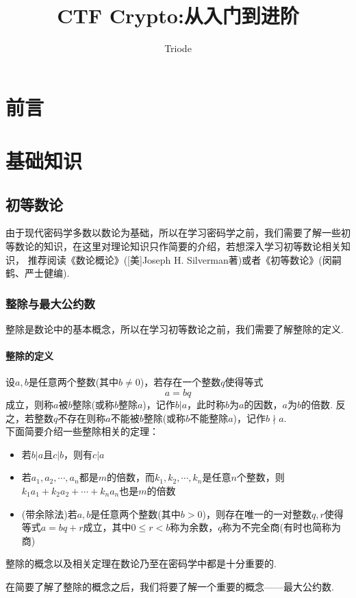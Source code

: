 \documentclass{article}
\numberwithin{equation}{subsubsection}
\begin{document}
\title{CTF Crypto:从入门到进阶}
\author{Triode}
\date{}
\maketitle

\tableofcontents
\newpage
{}

\section{前言}
\newpage

\section{基础知识}
\subsection{初等数论}
由于现代密码学多数以数论为基础，所以在学习密码学之前，我们需要了解一些初等数论的知识，在这里对理论知识只作简要的介绍，若想深入学习初等数论相关知识，
推荐阅读《数论概论》([美]Joseph H. Silverman著)或者《初等数论》(闵嗣鹤、严士健编).
\subsubsection{整除与最大公约数}
整除是数论中的基本概念，所以在学习初等数论之前，我们需要了解整除的定义.
\paragraph{\textbf{整除的定义}}
设$a,b$是任意两个整数(其中$b\neq 0$)，若存在一个整数$q$使得等式
\begin{equation}
    a = bq
    \nonumber
\end{equation}
成立，则称$a$被$b$整除(或称$b$整除$a$)，记作$b|a$，此时称$b$为$a$的因数，$a$为$b$的倍数.
反之，若整数$q$不存在则称$a$不能被$b$整除(或称$b$不能整除$a$)，记作$b\nmid a$.\\
下面简要介绍一些整除相关的定理：
\begin{itemize}
    \item 若$b|a$且$c|b$，则有$c|a$
    \item 若$a_1, a_2,\cdots,a_n$都是$m$的倍数，而$k_1,k_2,\cdots,k_n$是任意$n$个整数，则$k_1a_1+k_2a_2+\cdots+k_na_n$也是$m$的倍数
    \item (带余除法)若$a,b$是任意两个整数(其中$b>0$)，则存在唯一的一对整数$q,r$使得等式$a=bq+r$成立，其中$0\leq r < b$称为余数，$q$称为不完全商(有时也简称为商)
\end{itemize}
整除的概念以及相关定理在数论乃至在密码学中都是十分重要的.\par
在简要了解了整除的概念之后，我们将要了解一个重要的概念——最大公约数.
\end{document}
